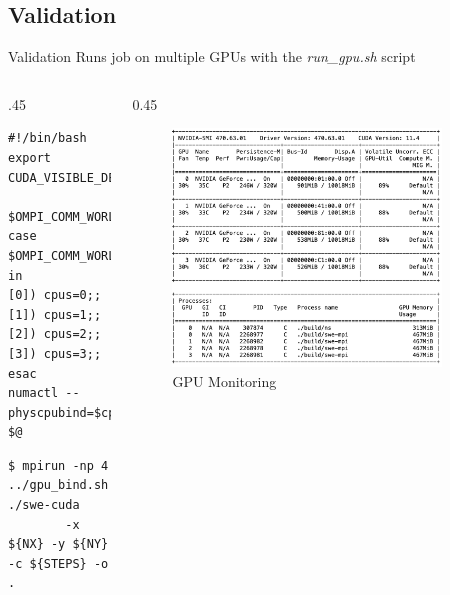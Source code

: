 \documentclass[
  english,            %
  aspectratio=169,    %
  11pt
]{tumbeamer}
\begin{document}
\subsection{Validation}
\begin{frame}[fragile]{Validation}
Runs job on multiple GPUs with the \textit{run\_gpu.sh} script
\begin{columns}
	\begin{column}{.45\textwidth}
\begin{lstlisting}[frame=single] 
#!/bin/bash
export CUDA_VISIBLE_DEVICES=\
	$OMPI_COMM_WORLD_LOCAL_RANK
case $OMPI_COMM_WORLD_LOCAL_RANK in
[0]) cpus=0;;
[1]) cpus=1;;
[2]) cpus=2;;
[3]) cpus=3;;
esac
numactl --physcpubind=$cpus $@
\end{lstlisting}
\begin{lstlisting}
$ mpirun -np 4 ../gpu_bind.sh ./swe-cuda 
		-x ${NX} -y ${NY} -c ${STEPS} -o .
\end{lstlisting}
	\end{column}

	\begin{column}{0.45\textwidth}
		\begin{figure}[htpb]
			\centering
			\includegraphics[width=0.9\textwidth,keepaspectratio=true]{figs/cuda4096-4.png}
			\caption{GPU Monitoring}
			\label{fig:GPUMonitor}
		\end{figure}
	\end{column}
\end{columns}

\end{frame}
\end{document}

